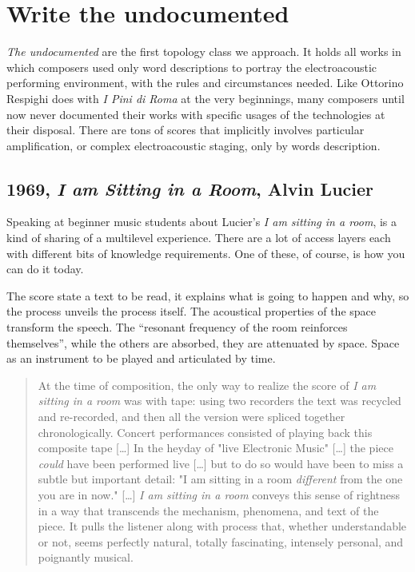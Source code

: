 \documentclass[twoside,a4paper]{article}
\begin{document}
\section{Write the undocumented}
\label{sec:writing}

\emph{The undocumented} are the first topology class we approach. It holds all
works in which composers used only word descriptions to portray the electroacoustic
performing environment, with the rules and circumstances needed. Like Ottorino
Respighi does with \emph{I Pini di Roma} \cite{ropr25} at the very beginnings,
many composers until now never documented their works with specific usages of the
technologies at their disposal. There are tons of scores that implicitly involves
particular amplification, or complex electroacoustic staging, only by words
description.


\subsection{1969, \emph{I am Sitting in a Room}, Alvin Lucier}

Speaking at beginner music students about Lucier's \emph{I am sitting in a room},
is a kind of sharing of a multilevel experience. There are a lot of access layers
each with different bits of knowledge requirements. One of these, of course, is
how you can do it today.

The score state a text to be read, it explains what is going to happen and why,
so the process unveils the process itself. The acoustical properties of the
space transform the speech. The “resonant frequency of the room reinforces
themselves”, while the others are absorbed, they are attenuated by space. Space
as an instrument to be played and articulated by time.

\begin{quote}
At the time of composition, the only way to realize the score of \emph{I am
sitting in a room} was with tape: using two recorders the text was recycled and
re-recorded, and then all the version were spliced together chronologically.
Concert performances consisted of playing back this composite tape [\ldots] In
the heyday of "live Electronic Music" [\ldots] the piece \emph{could} have been
performed live [\ldots] but to do so would have been to miss a subtle but
important detail: "I am sitting in a room \emph{different} from the one you are
in now." [\ldots] \emph{I am sitting in a room} conveys this sense of rightness
in a way that transcends the mechanism, phenomena, and text of the piece. It
pulls the listener along with process that, whether understandable or not, seems
perfectly natural, totally fascinating, intensely personal, and poignantly
musical. \cite{alCD90}
\end{quote}
\end{document}
